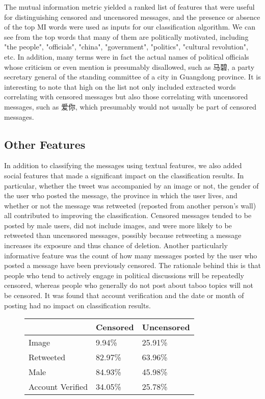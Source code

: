 \documentclass{article} %
\begin{document}
\begin{CJK*}{UTF8}{gbsn}
The mutual information metric yielded a ranked list of features that were useful for distinguishing censored and uncensored messages, and the presence or absence of the top MI words were used as inputs for our classification algorithm. We can see from the top words that many of them are politically motivated, including "the people", "officials", "china", "government", "politics", "cultural revolution", etc. In addition, many terms were in fact the actual names of political officials whose criticism or even mention is presumably disallowed, such as 马碧, a party secretary general of the standing committee of a city in Guangdong province. It is interesting to note that high on the list not only included extracted words correlating with censored messages but also those correlating with uncensored messages, such as 爱你, which presumably would not usually be part of censored messages. 

\subsection{Other Features}
In addition to classifying the messages using textual features, we also added social features that made a significant impact on the classification results. In particular, whether the tweet was accompanied by an image or not, the gender of the user who posted the message, the province in which the user lives, and whether or not the message was retweeted (reposted from another person's wall) all contributed to improving the classification. Censored messages tended to be posted by male users, did not include images, and were more likely to be retweeted than uncensored messages, possibly because retweeting a message increases its exposure and thus chance of deletion. Another particularly informative feature was the count of how many messages posted by the user who posted a message have been previously censored. The rationale behind this is that people who tend to actively engage in political discussions will be repeatedly censored, whereas people who generally do not post about taboo topics will not be censored. It was found that account verification and the date or month of posting had no impact on classification results. 

\begin{figure}[!htb]
	\begin{center}
		    \begin{tabular}{ | l | l | l |}
		    \hline
		    & Censored & Uncensored \\\hline
		    Image & 9.94\%& 25.91\% \\ \hline
		   	Retweeted & 82.97\% & 63.96\% \\ \hline
		  	Male & 84.93\% & 45.98\% \\\hline
		   	Account Verified & 34.05\% & 25.78\%\\\hline


\end{tabular}
\end{center}
\end{figure}
\end{CJK*}
\end{document}
